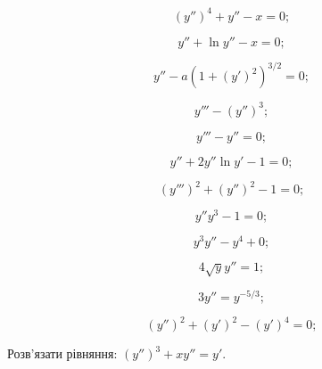 \begin{multicols}{2}
    \begin{problem}
    	\[(y'')^4+y''-x=0;\]
    \end{problem}
    
    \begin{problem}
    	\[y''+\ln y''-x=0;\]
    \end{problem}
    
    \begin{problem}
    	\[y''-a(1+(y')^2)^{3/2}=0;\]
    \end{problem}
    
    \begin{problem}
    	\[y'''-(y'')^3;\]
    \end{problem}
    
    \begin{problem}
    	\[y'''-y''=0;\]
    \end{problem}
    
    \begin{problem}
    	\[y''+2y''\ln y'-1=0;\]
    \end{problem}
    
    \begin{problem}
    	\[(y''')^2+(y'')^2-1=0;\]
    \end{problem}
    
    \begin{problem}
    	\[y'' y^3-1=0;\]
    \end{problem}
    
    \begin{problem}
    	\[y^3 y''-y^4+0;\]
    \end{problem}
    
    \begin{problem}
    	\[4\sqrt{y} y''=1;\]
    \end{problem}
    
    \begin{problem}
    	\[3y''=y^{-5/3};\]
    \end{problem}
    
    \begin{problem}
    	\[(y'')^2+(y')^2-(y')^4=0;\]
    \end{problem}
\end{multicols}

\begin{example}
	Розв'язати рівняння: $(y'')^3 + x  y'' = y'$.
\end{example}

